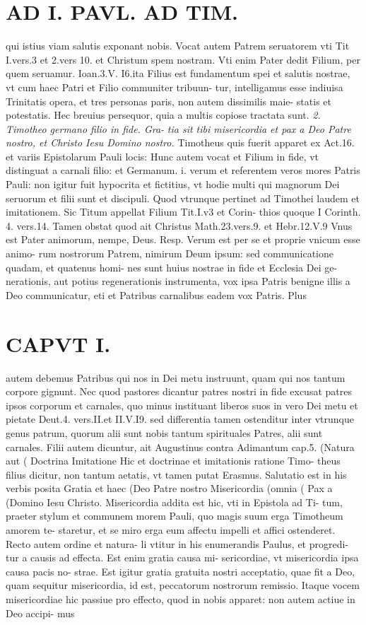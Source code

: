 \documentclass{article}
\begin{document}
\begin{pages}
\section*{AD I. PAVL. AD TIM. }
\marginpar{[ p.4 ]}qui istius viam salutis exponant nobis. Vocat autem Patrem seruatorem vti Tit I.vers.3 et 2.vers 10. et Christum spem nostram. Vti enim Pater dedit Filium, per quem seruamur. Ioan.3.V. I6.ita Filius est fundamentum spei et salutis nostrae, vt cum haec Patri et Filio communiter tribuun- tur, intelligamus esse indiuisa Trinitatis opera, et tres personas paris, non autem dissimilis maie- statis et potestatis. Hec breuius persequor, quia a multis copiose tractata sunt. \textit{2. Timotheo germano filio in fide. Gra-} \textit{tia sit tibi misericordia et pax a Deo Patre} \textit{nostro, et Christo Iesu Domino nostro.} Timotheus quis fuerit apparet ex Act.16. et variis Epistolarum Pauli locis: Hunc autem vocat et Filium in fide, vt distinguat a carnali filio: et Germanum. i. verum et referentem veros mores Patris Pauli: non igitur fuit hypocrita et fictitius, vt hodie multi qui magnorum Dei seruorum et filii sunt et discipuli. Quod vtrunque pertinet ad Timothei laudem et imitationem. Sic Titum appellat Filium Tit.I.v3 et Corin- thios quoque I Corinth. 4. vers.14. Tamen obstat quod ait Christus Math.23.vers.9. et Hebr.12.V.9 Vnus est Pater animorum, nempe, Deus. Resp. Verum est per se et proprie vnicum esse animo- rum nostrorum Patrem, nimirum Deum ipsum: sed communicatione quadam, et quatenus homi- nes sunt huius nostrae in fide et Ecclesia Dei ge- nerationis, aut potius regenerationis instrumenta, vox ipsa Patris benigne illis a Deo communicatur, eti et Patribus carnalibus eadem vox Patris. Plus 
\section*{CAPVT  I. }
\marginpar{[ p.5 ]}autem debemus Patribus qui nos in Dei metu instruunt, quam qui nos tantum corpore gignunt. Nec quod pastores dicantur patres nostri in fide excusat patres ipsos corporum et carnales, quo minus instituant liberos suos in vero Dei metu et pietate Deut.4. vers.II.et II.V.I9. sed differentia tamen ostenditur inter vtrunque genus patrum, quorum alii sunt nobis tantum spirituales Patres, alii sunt carnales. Filii autem dicuntur, ait Augustinus contra Adimantum cap.5. (Natura aut ( Doctrina Imitatione Hic et doctrinae et imitationis ratione Timo- theus filius dicitur, non tantum aetatis, vt tamen putat Erasmus. Salutatio est in his verbis posita Gratia et haec (Deo Patre nostro Misericordia (omnia ( Pax a (Domino Iesu Christo. Misericordia addita est hic, vti in Epistola ad Ti- tum, praeter stylum et communem morem Pauli, quo magis suum erga Timotheum amorem te- staretur, et se miro erga eum affectu impelli et affici ostenderet. Recto autem ordine et natura- li vtitur in his enumerandis Paulus, et progredi- tur a causis ad effecta. Est enim gratia causa mi- sericordiae, vt misericordia ipsa causa pacis no- strae. Est igitur gratia gratuita nostri acceptatio, quae fit a Deo, quam sequitur misericordia, id est, peccatorum nostrorum remissio. Itaque vocem misericordiae hic passiue pro effecto, quod in nobis apparet: non autem actiue in Deo accipi- mus 

\end{pages}
\end{document}
